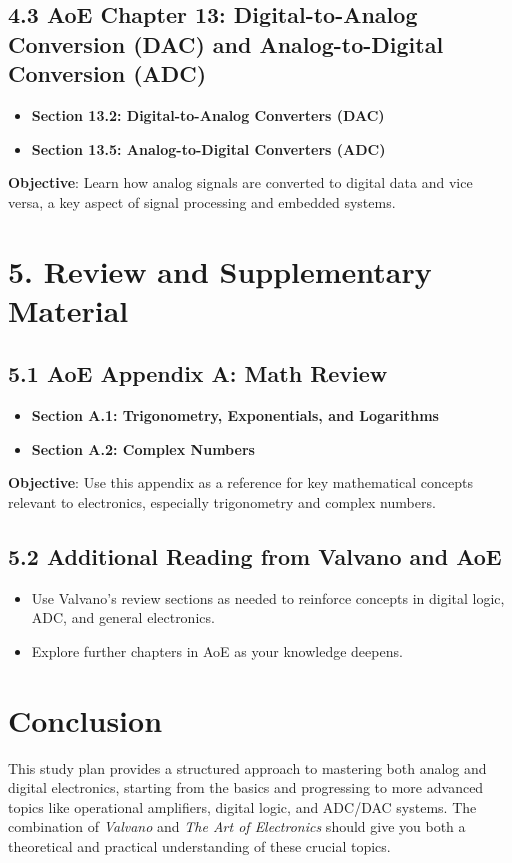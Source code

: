 \documentclass{article}
\begin{document}
\subsection*{4.3 AoE Chapter 13: Digital-to-Analog Conversion (DAC) and Analog-to-Digital Conversion (ADC)}
\begin{itemize}
    \item \textbf{Section 13.2: Digital-to-Analog Converters (DAC)}
    \item \textbf{Section 13.5: Analog-to-Digital Converters (ADC)}
\end{itemize}
\textbf{Objective}: Learn how analog signals are converted to digital data and vice versa, a key aspect of signal processing and embedded systems.

\section*{5. Review and Supplementary Material}

\subsection*{5.1 AoE Appendix A: Math Review}
\begin{itemize}
    \item \textbf{Section A.1: Trigonometry, Exponentials, and Logarithms}
    \item \textbf{Section A.2: Complex Numbers}
\end{itemize}
\textbf{Objective}: Use this appendix as a reference for key mathematical concepts relevant to electronics, especially trigonometry and complex numbers.

\subsection*{5.2 Additional Reading from Valvano and AoE}
\begin{itemize}
    \item Use Valvano’s review sections as needed to reinforce concepts in digital logic, ADC, and general electronics.
    \item Explore further chapters in AoE as your knowledge deepens.
\end{itemize}

\section*{Conclusion}
This study plan provides a structured approach to mastering both analog and digital electronics, starting from the basics and progressing to more advanced topics like operational amplifiers, digital logic, and ADC/DAC systems. The combination of \textit{Valvano} and \textit{The Art of Electronics} should give you both a theoretical and practical understanding of these crucial topics.
\end{document}
